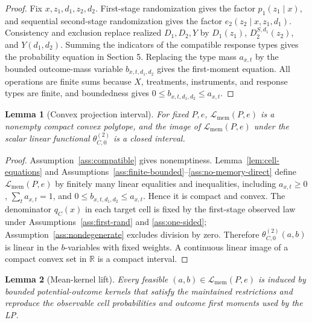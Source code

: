 \documentclass[11pt]{article}
\theoremstyle{definition}
\theoremstyle{plain}
\newtheorem{lemma}{Lemma}
\theoremstyle{remark}
\begin{document}
\begin{proof}
Fix \(x,z_1,d_1,z_2,d_2\).  First-stage randomization gives the factor \(p_1(z_1\mid x)\), and sequential second-stage randomization gives the factor \(e_2(z_2\mid x,z_1,d_1)\).  Consistency and exclusion replace realized \(D_1,D_2,Y\) by \(D_1(z_1)\), \(D_2^{S,d_1}(z_2)\), and \(Y(d_1,d_2)\).  Summing the indicators of the compatible response types gives the probability equation in Section 5.  Replacing the type mass \(a_{x,t}\) by the bounded outcome-mass variable \(b_{x,t,d_1,d_2}\) gives the first-moment equation.  All operations are finite sums because \(X\), treatments, instruments, and response types are finite, and boundedness gives \(0\le b_{x,t,d_1,d_2}\le a_{x,t}\).
\end{proof}

\begin{lemma}[Convex projection interval]\label{lem:convex-interval}
For fixed \(P,e\), \(\mathcal L_{\mathrm{mem}}(P,e)\) is a nonempty compact convex polytope, and the image of \(\mathcal L_{\mathrm{mem}}(P,e)\) under the scalar linear functional \(\theta_{C,0}^{(2)}\) is a closed interval.
\end{lemma}

\begin{proof}
Assumption~\ref{ass:compatible} gives nonemptiness.  Lemma~\ref{lem:cell-equations} and Assumptions~\ref{ass:finite-bounded}--\ref{ass:no-memory-direct} define \(\mathcal L_{\mathrm{mem}}(P,e)\) by finitely many linear equalities and inequalities, including \(a_{x,t}\ge0\), \(\sum_t a_{x,t}=1\), and \(0\le b_{x,t,d_1,d_2}\le a_{x,t}\).  Hence it is compact and convex.  The denominator \(q_C(x)\) in each target cell is fixed by the first-stage observed law under Assumptions~\ref{ass:first-rand} and \ref{ass:one-sided}; Assumption~\ref{ass:nondegenerate} excludes division by zero.  Therefore \(\theta_{C,0}^{(2)}(a,b)\) is linear in the \(b\)-variables with fixed weights.  A continuous linear image of a compact convex set in \(\mathbb R\) is a compact interval.
\end{proof}

\begin{lemma}[Mean-kernel lift]\label{lem:mean-kernel-lift}
Every feasible \((a,b)\in\mathcal L_{\mathrm{mem}}(P,e)\) is induced by bounded potential-outcome kernels that satisfy the maintained restrictions and reproduce the observable cell probabilities and outcome first moments used by the LP.
\end{lemma}
\end{document}
